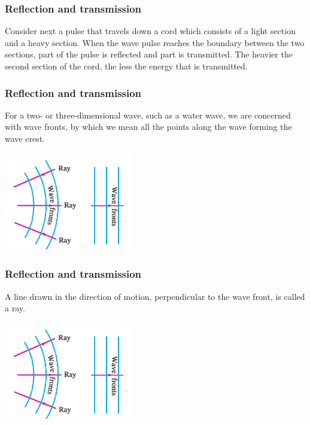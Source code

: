 \documentclass[]{beamer}
\begin{document}


\begin{frame}
\frametitle{Reflection and transmission }

Consider next a pulse that travels down a cord which consists of a light section
and a heavy section.  When the wave pulse reaches the
boundary between the two sections, part of the pulse is reflected and part is
transmitted. The heavier the second section of the cord, the less the
energy that is transmitted.


  \end{frame}







\begin{frame}
\frametitle{Reflection and transmission }




For a two- or three-dimensional wave, such as a water wave, we are concerned
with wave fronts, by which we mean all the points along the wave forming the
wave crest.



  \begin{center}
  \includegraphics[height=1.7in]{images4/13.jpg}
\end{center}

  \end{frame}





\begin{frame}
\frametitle{Reflection and transmission }






A line drawn in the direction of motion, perpendicular to the wave front, is called a ray.



  \begin{center}
  \includegraphics[height=1.7in]{images4/13.jpg}
\end{center}

  \end{frame}
\end{document}
